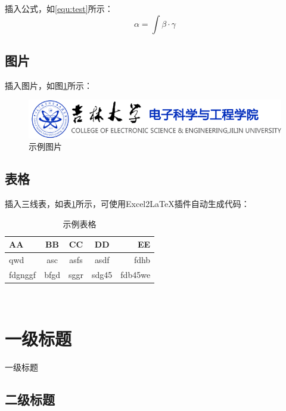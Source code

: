 \documentclass[openany,oneside]{book}
\begin{document}
插入公式，如\ref{equ:test}所示：
\begin{equation}
	\alpha = \int  \beta \cdot \gamma 
	\label{equ:test}
\end{equation}


\section{图片}

插入图片，如图\ref{fig:test}所示：
\begin{figure}[htb]
	\centering
	\includegraphics[width=0.8\linewidth]{fig/jlu}
	\caption{示例图片}
	\label{fig:test}
\end{figure}


\section{表格}

插入三线表，如表\ref{tab:test}所示，可使用Excel2LaTeX插件自动生成代码：
\begin{table}[htb]{
    \centering
    \setlength{\belowcaptionskip}{1ex}
    \caption{示例表格}
    \label{tab:test}
    \setlength{\tabcolsep}{8mm}
    
    \begin{tabular}{lcccr}
        \toprule
        AA & BB & CC & DD & EE \\ 
        \midrule
        qwd & asc & asfs & asdf & fdhb \\ 
        fdgnggf  & bfgd & sggr & sdg45 & fdb45we \\
        \bottomrule
    \end{tabular}\\
}
\end{table}



\chapter{一级标题}

一级标题

\section{二级标题}
\end{document}
